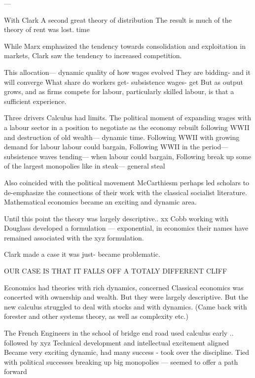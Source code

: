---


With Clark
A second great theory of distribution
The result is much of the theory of rent was lost. 
time

While Marx emphasized the tendency towards consolidation and exploitation in markets, Clark saw the tendency to increased competition. 

This allocation— dynamic quality of how wages evolved
They are bidding- and it will converge 
What share do workers get- subsistence wages- get 
But as output grows, and as firms compete for labour, particularly skilled labour, is that a sufficient experience.



Three drivers
Calculus had limits.
The political moment of expanding wages with a labour sector in a position to negotiate as the economy rebuilt following WWII and destruction of old wealth— dynamic time. 
Following WWII with growing demand for labour labour could bargain, 
Following WWII in the period— subsistence waves tending— when labour could bargain,
Following break up some of the largest monopolies like in steak— general steal


Also coincided with the political movement McCarthiesm perhaps led scholars to de-emphasize the connections of their work with the classical socialist literature.
Mathematical economics became an exciting and dynamic area.

Until this point the theory was largely descriptive..
xx Cobb working with Douglass developed a formulation — exponential, in economics their names have remained associated with the xyz formulation. 

Clark made a case it was just- became problematic.

OUR CASE IS THAT IT FALLS OFF A TOTALY DIFFERENT CLIFF



Economics had theories with rich dynamics, concerned 
Classical economics was concerted with ownership and wealth. But they were largely descriptive.
But the new calculus struggled to deal with stocks and with dynamics. 
(Came back with forester and other systems theory, as well as complexity etc.)

The French Engineers in the school of bridge end road used calculus early .. followed by xyz
Technical development and intellectual excitement aligned
Became very exciting dynamic, had many success - took over the discipline. 
Tied with political successes breaking up big monopolies — seemed to offer a path forward

